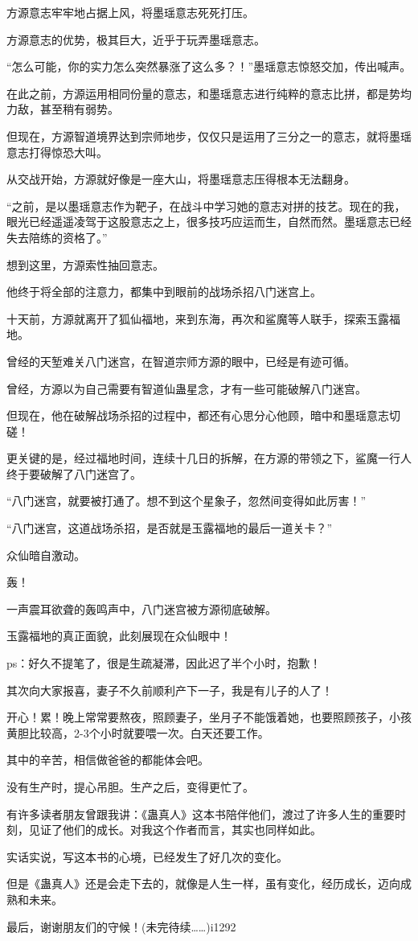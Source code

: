 \begin{this_body}
方源意志牢牢地占据上风，将墨瑶意志死死打压。

方源意志的优势，极其巨大，近乎于玩弄墨瑶意志。

“怎么可能，你的实力怎么突然暴涨了这么多？！”墨瑶意志惊怒交加，传出喊声。

在此之前，方源运用相同份量的意志，和墨瑶意志进行纯粹的意志比拼，都是势均力敌，甚至稍有弱势。

但现在，方源智道境界达到宗师地步，仅仅只是运用了三分之一的意志，就将墨瑶意志打得惊恐大叫。

从交战开始，方源就好像是一座大山，将墨瑶意志压得根本无法翻身。

“之前，是以墨瑶意志作为靶子，在战斗中学习她的意志对拼的技艺。现在的我，眼光已经遥遥凌驾于这股意志之上，很多技巧应运而生，自然而然。墨瑶意志已经失去陪练的资格了。”

想到这里，方源索性抽回意志。

他终于将全部的注意力，都集中到眼前的战场杀招八门迷宫上。

十天前，方源就离开了狐仙福地，来到东海，再次和鲨魔等人联手，探索玉露福地。

曾经的天堑难关八门迷宫，在智道宗师方源的眼中，已经是有迹可循。

曾经，方源以为自己需要有智道仙蛊星念，才有一些可能破解八门迷宫。

但现在，他在破解战场杀招的过程中，都还有心思分心他顾，暗中和墨瑶意志切磋！

更关键的是，经过福地时间，连续十几日的拆解，在方源的带领之下，鲨魔一行人终于要破解了八门迷宫了。

“八门迷宫，就要被打通了。想不到这个星象子，忽然间变得如此厉害！”

“八门迷宫，这道战场杀招，是否就是玉露福地的最后一道关卡？”

众仙暗自激动。

轰！

一声震耳欲聋的轰鸣声中，八门迷宫被方源彻底破解。

玉露福地的真正面貌，此刻展现在众仙眼中！

ps：好久不提笔了，很是生疏凝滞，因此迟了半个小时，抱歉！

其次向大家报喜，妻子不久前顺利产下一子，我是有儿子的人了！

开心！累！晚上常常要熬夜，照顾妻子，坐月子不能饿着她，也要照顾孩子，小孩黄胆比较高，2-3个小时就要喂一次。白天还要工作。

其中的辛苦，相信做爸爸的都能体会吧。

没有生产时，提心吊胆。生产之后，变得更忙了。

有许多读者朋友曾跟我讲：《蛊真人》这本书陪伴他们，渡过了许多人生的重要时刻，见证了他们的成长。对我这个作者而言，其实也同样如此。

实话实说，写这本书的心境，已经发生了好几次的变化。

但是《蛊真人》还是会走下去的，就像是人生一样，虽有变化，经历成长，迈向成熟和未来。

最后，谢谢朋友们的守候！(未完待续……)i1292

\end{this_body}

